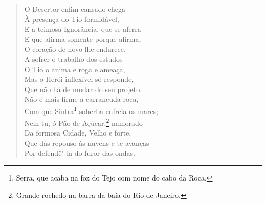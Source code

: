 \begin{verse}
O Desertor enfim cansado chega\\
À presença do Tio formidável,\\
E a teimosa Ignorância, que se aferra\\			\index{\Ignor}
E que afirma somente porque afirma,\\
O coração de novo lhe endurece.\\
A sofrer o trabalho dos estudos\\
O Tio o anima e roga e ameaça,\\
Mas o Herói inflexível só responde,\\
Que não há de mudar do seu projeto.\\
Não é mais firme a carrancuda roca,\\
Com que Sintra\footnote{ Serra, que acaba na foz do Tejo com nome do
cabo da Roca.} soberba enfreia os mares;\\
Nem tu, ó Pão de Açúcar,\footnote{ Grande rochedo na barra da baía do
Rio de Janeiro.} namorado\\
Da formosa Cidade, Velho e forte,\\
Que dás repouso às nuvens e te avanças\\
Por defendê"-la do furor das ondas. \\[10pt]



\end{verse}
